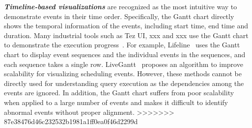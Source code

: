 \emph{\textbf{Timeline-based visualizations}} are recognized as the most intuitive way to demonstrate events in their time order. Specifically, the Gantt chart directly shows the temporal information of the events, including start time, end time and duration. Many industrial tools such as Tez UI, xxx and xxx use the Gantt chart to demonstrate the execution progress~\cite{}. For example, Lifeline~\cite{plaisant1996lifelines} uses the Gantt chart to display event sequences and the individual events in the sequences, and each sequence takes a single row. LiveGantt~\cite{jo2014livegantt} proposes an algorithm to improve scalability for visualizing scheduling events. However, these methods cannot be directly used for understanding query execution as the dependencies among the events are ignored. In addition, the Gantt chart suffers from poor scalability when applied to a large number of events and makes it difficult to identify abnormal events without proper alignment.
>>>>>>> 87e38476d46c232532b1981a1ff0ea0f46d2299d

